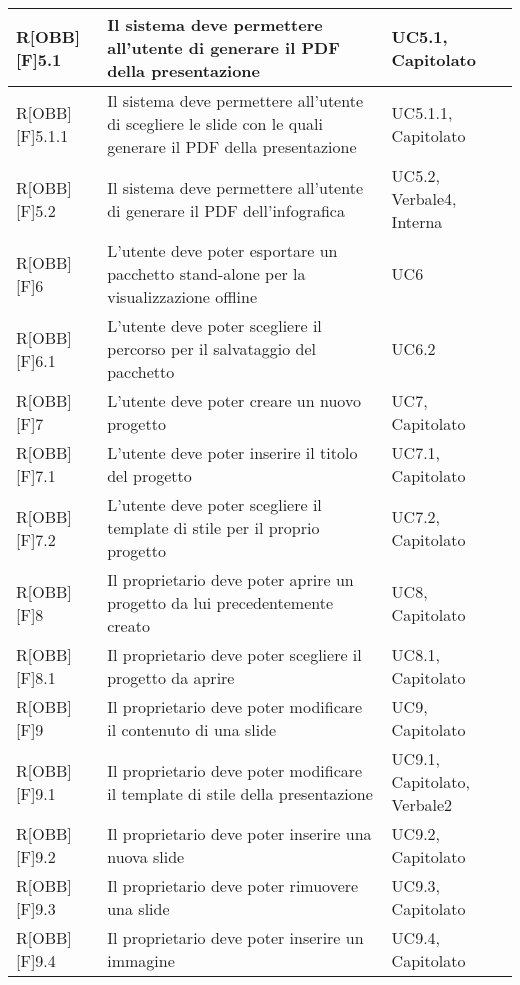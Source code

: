 \begin{table}[h]
\begin{tabular}{|p{}|p{}|p{}|}
		\end{tabular}
	\end{table}
	\newpage
	
	\begin{table}[h]
		\begin{tabular}{|p{}|p{}|p{}|}
			\midrule

R[OBB][F]5.1 & Il sistema deve permettere all'utente di generare il PDF della presentazione & UC5.1, Capitolato \\ \midrule
R[OBB][F]5.1.1 & Il sistema deve permettere all'utente di scegliere le slide con le quali generare il PDF della presentazione & UC5.1.1, Capitolato \\ \midrule
R[OBB][F]5.2 & Il sistema deve permettere all'utente di generare il PDF dell'infografica & UC5.2, Verbale4, Interna \\ \midrule
R[OBB][F]6 & L'utente deve poter esportare un pacchetto stand-alone per la visualizzazione offline & UC6 \\ \midrule
R[OBB][F]6.1 & L'utente deve poter scegliere il percorso per il salvataggio del pacchetto & UC6.2 \\ \midrule
R[OBB][F]7 & L'utente deve poter creare un nuovo progetto & UC7, Capitolato \\ \midrule
R[OBB][F]7.1 & L'utente deve poter inserire il titolo del progetto & UC7.1, Capitolato \\ \midrule
R[OBB][F]7.2 & L'utente deve poter scegliere il template di stile per il proprio progetto & UC7.2, Capitolato \\ \midrule
R[OBB][F]8 & Il proprietario deve poter aprire un progetto da lui precedentemente creato & UC8, Capitolato \\ \midrule
R[OBB][F]8.1 & Il proprietario deve poter scegliere il progetto da aprire & UC8.1, Capitolato \\ \midrule
R[OBB][F]9 & Il proprietario deve poter modificare il contenuto di una slide & UC9, Capitolato \\ \midrule
R[OBB][F]9.1 & Il proprietario deve poter modificare il template di stile della presentazione & UC9.1, Capitolato, Verbale2 \\ \midrule
R[OBB][F]9.2 & Il proprietario deve poter inserire una nuova slide & UC9.2, Capitolato \\ \midrule
R[OBB][F]9.3 & Il proprietario deve poter rimuovere una slide & UC9.3, Capitolato \\ \midrule
R[OBB][F]9.4 & Il proprietario deve poter inserire un immagine & UC9.4, Capitolato \\ \midrule

\end{tabular}
\end{table}
